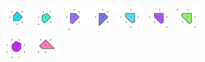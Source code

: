 \documentclass[text.tex]{subfiles}
\begin{document}
\begin{figure}[h!]
\includegraphics[width=0.12\textwidth]{img/results/octagon/octagon_107106_(-11_5alpha_1)_005.pdf}
\includegraphics[width=0.12\textwidth]{img/results/octagon/octagon_107106_(-11_5alpha_1)_006.pdf}
\includegraphics[width=0.12\textwidth]{img/results/octagon/octagon_107106_(-11_5alpha_1)_007.pdf}
\includegraphics[width=0.12\textwidth]{img/results/octagon/octagon_107106_(-11_5alpha_1)_008.pdf}
\includegraphics[width=0.12\textwidth]{img/results/octagon/octagon_107106_(-11_5alpha_1)_009.pdf}
\includegraphics[width=0.12\textwidth]{img/results/octagon/octagon_107106_(-11_5alpha_1)_010.pdf}
\includegraphics[width=0.12\textwidth]{img/results/octagon/octagon_107106_(-11_5alpha_1)_011.pdf}
\includegraphics[width=0.12\textwidth]{img/results/octagon/octagon_107106_(-11_5alpha_1)_012.pdf}
\includegraphics[width=0.12\textwidth]{img/results/octagon/octagon_107106_(-11_5alpha_1)_013.pdf}

\end{figure}
\end{document}
